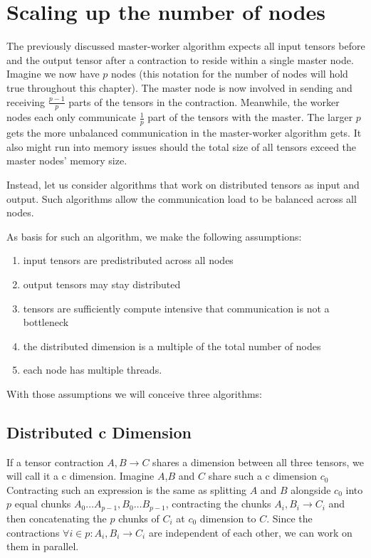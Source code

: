 \section{Scaling up the number of nodes}

The previously discussed master-worker algorithm expects all input tensors before and the output tensor after a contraction to reside within a single master node.
Imagine we now have $p$ nodes (this notation for the number of nodes will hold true throughout this chapter).
The master node is now involved in sending and receiving $\frac{p-1}{p}$ parts of the tensors in the contraction.
Meanwhile, the worker nodes each only communicate $\frac{1}{p}$ part of the tensors with the master.
The larger $p$ gets the more unbalanced communication in the master-worker algorithm gets.
It also might run into memory issues should the total size of all tensors exceed the master nodes' memory size.

Instead, let us consider algorithms that work on distributed tensors as input and output.
Such algorithms allow the communication load to be balanced across all nodes.

As basis for such an algorithm, we make the following assumptions:
\begin{enumerate}
    \item input tensors are predistributed across all nodes
    \item output tensors may stay distributed
    \item tensors are sufficiently compute intensive that communication is not a bottleneck
    \item the distributed dimension is a multiple of the total number of nodes
    \item each node has multiple threads.
\end{enumerate}


With those assumptions we will conceive three algorithms:

\subsection{Distributed c Dimension}

If a tensor contraction $A,B \rightarrow C$ shares a dimension between all three tensors, we will call it a c dimension.
Imagine $A$,$B$ and $C$ share such a c dimension $c_0$
Contracting such an expression is the same as splitting $A$ and $B$ alongside $c_0$ into $p$ equal chunks $A_0\dots A_{p-1}, B_0\dots B_{p-1}$, contracting the chunks $A_i, B_i \rightarrow C_i$ and then concatenating the $p$ chunks of $C_i$ at $c_0$ dimension to $C$.
Since the contractions $\forall i \in p: A_i, B_i \rightarrow C_i$ are independent of each other, we can work on them in parallel.


